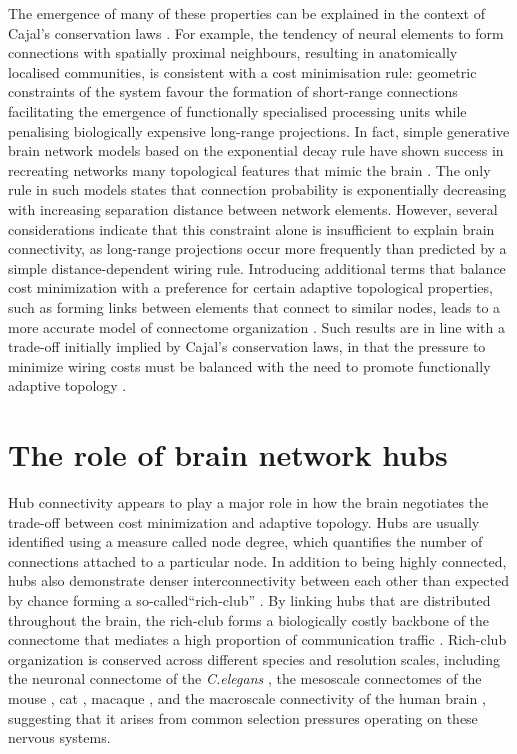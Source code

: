 The emergence of many of these properties can be explained in the context of Cajal’s conservation laws \citep{RamonyCajal1995}. For example, the tendency of neural elements to form connections with spatially proximal neighbours, resulting in anatomically localised communities, is consistent with a cost minimisation rule: geometric constraints of the system favour the formation of short-range connections facilitating the emergence of functionally specialised processing units while penalising biologically expensive long-range projections. In fact, simple generative brain network models based on the exponential decay rule have shown success in recreating networks many topological features that mimic the brain \citep{Ercsey-Ravasz2013,Henderson2014}. The only rule in such models states that connection probability is exponentially decreasing with increasing separation distance between network elements. However, several considerations indicate that this constraint alone is insufficient to explain brain connectivity, as long-range projections occur more frequently than predicted by a simple distance-dependent wiring rule. Introducing additional terms that balance cost minimization with a preference for certain adaptive topological properties, such as forming links between elements that connect to similar nodes, leads to a more accurate model of connectome organization \citep{Betzel2016,Vertes2012}. Such results are in line with a trade-off initially implied by Cajal’s conservation laws, in that the pressure to minimize wiring costs must be balanced with the need to promote functionally adaptive topology \citep{Bullmore2012}. 

\section{The role of brain network hubs}

Hub connectivity appears to play a major role in how the brain negotiates the trade-off between cost minimization and adaptive topology. Hubs are usually identified using a measure called node degree, which quantifies the number of connections attached to a particular node. In addition to being highly connected, hubs also demonstrate denser interconnectivity between each other than expected by chance forming a so-called``rich-club” \citep{Fulcher2016,Harriger2012,Towlson2013,VandenHeuvel2011,Zamora-Lopez2010}. By linking hubs that are distributed throughout the brain, the rich-club forms a biologically costly backbone of the connectome that mediates a high proportion of communication traffic \citep{VandenHeuvel2012}. Rich-club organization is conserved across different species and resolution scales, including the neuronal connectome of the \textit{C.elegans} \citep{Towlson2013}, the mesoscale connectomes of the mouse \citep{Oh2014,Fulcher2016}, cat \citep{DeReus2013b}, macaque \citep{Harriger2012}, and the macroscale connectivity of the human brain \citep{VandenHeuvel2011}, suggesting that it arises from common selection pressures operating on these nervous systems. 

